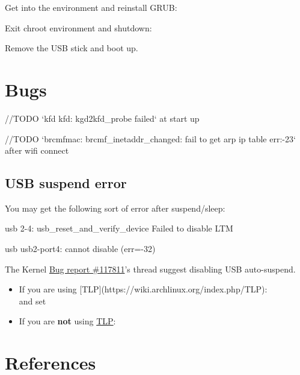 Get into the  environment and reinstall GRUB:


Exit chroot environment and shutdown:


Remove the USB stick and boot up.

\section{Bugs}

//TODO `kfd kfd: kgd2kfd\_probe failed` at start up

//TODO `brcmfmac: brcmf\_inetaddr\_changed: fail to get arp ip table err:-23` after wifi connect



\subsection{USB suspend error}

You may get the following sort of error after suspend/sleep:

\begin{codeblock}
	usb 2-4: usb\_reset\_and\_verify\_device Failed to disable LTM
	
	usb usb2-port4: cannot disable (err=-32)
\end{codeblock}

The Kernel \href{https://bugzilla.kernel.org/show_bug.cgi?id=117811}{Bug report \#117811}'s thread suggest disabling USB auto-suspend.

\begin{itemize}[noitemsep,topsep=0pt,leftmargin=*]
	\item If you are using [TLP](https://wiki.archlinux.org/index.php/TLP):\\
	 and set 
	\item If you are \textbf{not} using \href{https://wiki.archlinux.org/index.php/TLP}{TLP}:\\
\end{itemize}



\clearpage
\section{References}

